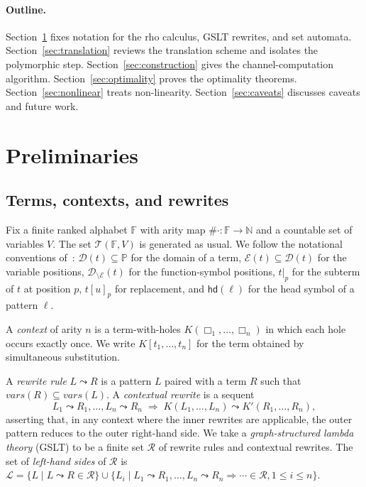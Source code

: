\documentclass[11pt]{article}
\theoremstyle{plain}
\theoremstyle{definition}
\theoremstyle{remark}
\newcommand{\rew}{\leadsto}
\newcommand{\Terms}{\mathcal{T}}
\newcommand{\Pos}{\mathbb{P}}
\newcommand{\Lhs}{\mathcal{L}}
\newcommand{\hd}{\mathsf{hd}}
\newcommand{\arity}[1]{\##1}
\newcommand{\dom}{\mathcal{D}}
\newcommand{\edges}{\mathcal{E}}
\begin{document}
\paragraph{Outline.}
Section~\ref{sec:prelim} fixes notation for the rho calculus, GSLT rewrites,
and set automata. Section~\ref{sec:translation} reviews the translation
scheme and isolates the polymorphic step.
Section~\ref{sec:construction} gives the channel-computation algorithm.
Section~\ref{sec:optimality} proves the optimality theorems.
Section~\ref{sec:nonlinear} treats non-linearity.
Section~\ref{sec:caveats} discusses caveats and future work.

\section{Preliminaries}\label{sec:prelim}

\subsection{Terms, contexts, and rewrites}

Fix a finite ranked alphabet $\mathbb{F}$ with arity map
$\arity{\cdot}: \mathbb{F} \to \mathbb{N}$ and a countable set of variables
$V$. The set $\Terms(\mathbb{F}, V)$ is generated as usual. We follow the
notational conventions of~\cite{BouwmanErkens2022,Baader1998}:
$\dom(t) \subseteq \Pos$ for the domain of a term, $\edges(t) \subseteq \dom(t)$
for the variable positions, $\dom_{\setminus\edges}(t)$ for the
function-symbol positions, $t|_{p}$ for the subterm of $t$ at position $p$,
$t[u]_{p}$ for replacement, and $\hd(\ell)$ for the head symbol of a
pattern $\ell$.

A \emph{context} of arity $n$ is a term-with-holes $K(\Box_{1}, \ldots, \Box_{n})$
in which each hole occurs exactly once. We write $K[t_{1}, \ldots, t_{n}]$
for the term obtained by simultaneous substitution.

A \emph{rewrite rule} $L \rew R$ is a pattern $L$ paired with a term $R$
such that $\mathit{vars}(R) \subseteq \mathit{vars}(L)$. A
\emph{contextual rewrite} is a sequent
\[
  L_{1} \rew R_{1}, \ldots, L_{n} \rew R_{n}
  \;\Rightarrow\;
  K(L_{1}, \ldots, L_{n}) \rew K'(R_{1}, \ldots, R_{n}),
\]
asserting that, in any context where the inner rewrites are
applicable, the outer pattern reduces to the outer right-hand side. We
take a \emph{graph-structured lambda theory} (GSLT) to be a finite set
$\mathcal{R}$ of rewrite rules and contextual rewrites. The set of
\emph{left-hand sides} of $\mathcal{R}$ is $\Lhs = \{L \mid L \rew R \in \mathcal{R}\} \cup
\{L_{i} \mid L_{1} \rew R_{1}, \ldots, L_{n} \rew R_{n} \Rightarrow \cdots \in \mathcal{R}, 1 \le i \le n\}$.
\end{document}
